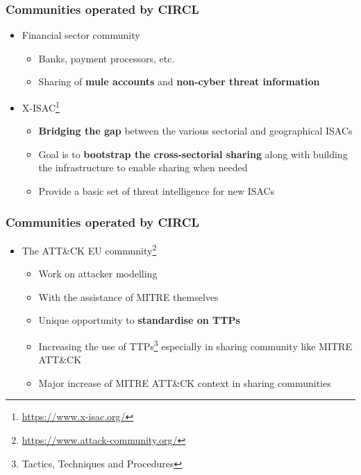 \begin{frame}
\frametitle{Communities operated by CIRCL}
\begin{itemize}
	\item Financial sector community
	\begin{itemize}
		\item Banks, payment processors, etc.
		\item Sharing of {\bf mule accounts} and {\bf non-cyber threat information}
	\end{itemize}
    \item X-ISAC\footnote{\url{https://www.x-isac.org/}}
	\begin{itemize}
		\item {\bf Bridging the gap} between the various sectorial and geographical ISACs
		\item Goal is to {\bf bootstrap the cross-sectorial sharing} along with building the infrastructure to enable sharing when needed
        \item Provide a basic set of threat intelligence for new ISACs 
	\end{itemize}
\end{itemize}
\end{frame}

\begin{frame}
\frametitle{Communities operated by CIRCL}
\begin{itemize}
        \item The ATT\&CK EU community\footnote{\url{https://www.attack-community.org/}}
	\begin{itemize}
		\item Work on attacker modelling
		\item With the assistance of MITRE themselves
		\item Unique opportunity to {\bf standardise on TTPs}
        \item Increasing the use of TTPs\footnote{Tactics, Techniques and Procedures} especially in sharing community like MITRE ATT\&CK
        \item Major increase of MITRE ATT\&CK context in sharing communities
	\end{itemize}
\end{itemize}
\end{frame}

